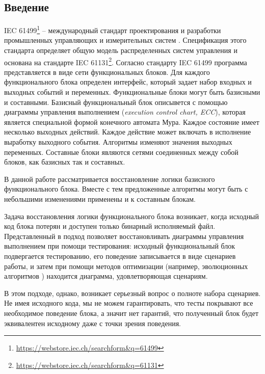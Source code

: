 \documentclass[14pt]{article}
\begin{document}
\pagebreak

\clearpage
\setcounter{page}{3}

\tableofcontents

\pagebreak

\subsection*{Введение}

IEC 61499\footnote{\url{https://webstore.iec.ch/searchform&q=61499}} --
международный стандарт проектирования и разработки промышленных управляющих и
измерительных систем \cite{iec}. Спецификация этого стандарта определяет общую модель
распределенных систем управления и основана на стандарте
IEC 61131\footnote{\url{https://webstore.iec.ch/searchform&q=61131}}. Согласно
стандарту IEC 61499 программа представляется в виде сети функциональных блоков.
Для каждого функционального блока определен интерфейс, который задает набор
входных и выходных событий и переменных. Функциональные блоки могут быть
базисными и составными. Базисный функциональный блок описывется с помощью
диаграммы управления выполнением (\textit{execution control chart, ECC}), которая является специальной формой конечного
автомата Мура. Каждое состояние имеет несколько выходных действий. Каждое
действие может включать в исполнение выработку выходного события. Алгоритмы
изменяют значения выходных переменных. Составные блоки являются сетями соединенных
между собой блоков, как базисных так и составных.

В данной работе рассматривается восстановление логики базисного
функционального блока. Вместе с тем предложенные алгоритмы могут быть с небольшими изменениями
применены и к составным блокам.

Задача восстановления логики функционального блока возникает, когда исходный код
блока потерян и доступен только бинарный исполняемый файл. Представленный
в \cite{rec} подход позволяет восстановливать диаграммы управления выполнением при помощи
тестирования: исходный функциональный блок подвергается тестированию, его
поведение записывается в виде сценариев работы, и затем при помощи
методов оптимизации (например, эволюционных алгоритмов \cite{ea}) находится диаграмма, удовлетворяющая сценариям.

В этом подходе, однако, возникает серьезный вопрос о полноте набора сценариев.
Не имея исходного кода, мы не можем гарантировать, что тесты покрывают все
необходимое поведение блока, а значит нет гарантий, что полученный блок будет
эквивалентен исходному даже с точки зрения поведения.
\end{document}
